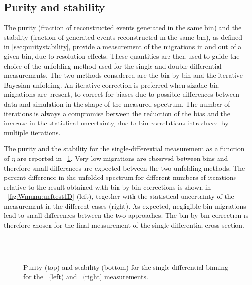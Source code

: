 \subsection{Purity and stability}
\label{sec:appmigrations}
The purity (fraction of reconstructed events generated in the same bin) 
and the stability (fraction of generated events reconstructed in the same bin), 
as defined in \ref{sec:puritystability}, provide a measurement of the migrations in and out of a given bin, due to resolution effects.
These quantities are then used to guide the choice of the unfolding method used for the single and double-differential measurements.
The two methods considered are the bin-by-bin and the iterative Bayesian unfolding. An iterative correction
is preferred when sizable bin migrations are present, to correct for biases due to possible differences between data and simulation
in the shape of the measured spectrum. The number of iterations is always a compromise between
the reduction of the bias and the increase in the statistical uncertainty, due to bin correlations introduced by multiple iterations.

The purity and the stability for the single-differential measurement as a function of $\eta$
are reported in \Fig~\ref{fig:Wmunu:PurityStability1D}. Very low migrations are observed between bins and therefore small differences
are expected between the two unfolding methods. The percent difference in the unfolded spectrum for different numbers
of iterations relative to the result obtained with bin-by-bin corrections is shown in \Fig~\ref{fig:Wmunu:unftest1D} (left), together
with the statistical uncertainty of the measurement in the different cases (right). As expected, negligible bin migrations lead to small differences between the two approaches. The bin-by-bin correction is therefore chosen for the final measurement of the single-differential cross-section.

\begin{figure}[phtb]
  \begin{center}
        \\
        \\
 \caption{Purity (top) and stability (bottom) for the single-differential binning for the \Wmunup~(left) and \Wmunum~(right) measurements.}
 \label{fig:Wmunu:PurityStability1D}
 \end{center}
\end{figure}

